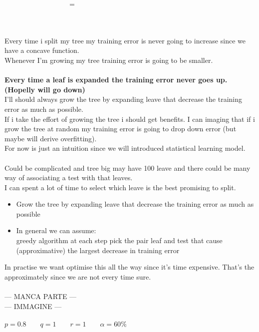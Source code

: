 \documentclass[../main.tex]{subfiles}
\begin{document}
$\qquad \qquad\qquad \qquad \quad= $ 
\\\\
\\\\
Every time i split my tree my training error is never going to increase since we
have a concave function.\\
Whenever I’m growing my tree training error is going to be smaller.\\\\
\textbf{Every time a leaf is expanded the training error never goes up.
(Hopelly will go down)}
\\
I’ll should always grow the tree by expanding leave that decrease the training
error as much as possible.\\
If i take the effort of growing the tree i should get benefits. I can imaging that if
i grow the tree at random my training error is going to drop down error (but
maybe will derive overfitting).\\
For now is just an intuition since we will introduced statistical learning model.\\\\
Could be complicated and tree big may have 100 leave and there could be
many way of associating a test with that leaves.\\
I can spent a lot of time to select which leave is the best promising to split.\\
\begin{itemize}
\item Grow the tree by expanding leave that decrease the training error as much
as possible
\item In general we can assume:\\greedy algorithm at each step pick the pair leaf and test that cause
(approximative) the largest decrease in training error\\
\end{itemize}
In practise we want optimise this all the way since it’s time expensive. That’s
the approximately since we are not every time sure.
\\\\
--- MANCA PARTE ---
\\
--- IMMAGINE ---
\\\\
$ p = 0.8 \qquad q = 1 \qquad r = 1 \qquad \alpha = 60\%$
\end{document}
